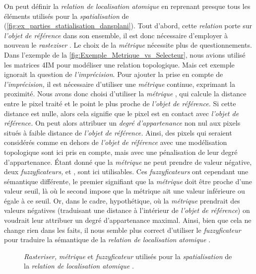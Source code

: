 On peut définir la \emph{relation de localisation atomique}
 en reprenant presque tous les
éléments utilisés pour la \emph{spatialisation} de
(\autoref{fig:ex_parties_statialisation_dansplani}). Tout d'abord,
cette \emph{relation} porte sur \emph{l'objet de référence} dans son
ensemble, il est donc nécessaire d'employer à nouveau le
\emph{rasteziser} . Le choix de la
\emph{métrique} nécessite plus de questionnements.
%
Dans l'exemple de la \autoref{fig:Exemple_Metrique_vs_Selecteur}, nous
avions utilisé les matrices 4IM pour modéliser une relation
topologique. Mais cet exemple ignorait la question de
\emph{l'imprécision}. Pour ajouter la prise en compte de
\emph{l'imprécision,} il est nécessaire d'utiliser une \emph{métrique}
continue, exprimant la proximité. Nous avons donc choisi d'utiliser la
\emph{métrique} , qui calcule la distance entre
le pixel traité et le point le plus proche de \emph{l'objet de
  référence.} Si cette distance est nulle, alors cela signifie que le
pixel est en contact avec \emph{l'objet de référence.} On peut alors
attribuer un \emph{degré d'appartenance} non nul aux pixels situés à
faible distance de \emph{l'objet de référence.} Ainsi, des pixels qui
seraient considérés comme en dehors de \emph{l'objet de référence}
avec une modélisation topologique sont ici pris en compte, mais avec
une pénalisation de leur degré d'appartenance. Étant donné que la
\emph{métrique}  ne peut prendre de valeur
négative, deux \emph{fuzzyficateurs,}  et
, sont ici utilisables. Ces
\emph{fuzzyficateurs} ont cependant une sémantique différente, le
premier signifiant que la \emph{métrique} doit être proche d'une
valeur seuil, là où le second impose que la métrique ait une valeur
inférieure ou égale à ce seuil. Or, dans le cadre, hypothétique, où la
\emph{métrique}  prendrait des valeurs négatives
(\ie traduisant une distance à l'intérieur de \emph{l'objet de
  référence}) on voudrait leur attribuer un degré d'appartenance
maximal. Ainsi, bien que cela ne change rien dans les faits, il nous
semble plus correct d'utiliser le \emph{fuzzyficateur}
 pour traduire la sémantique de la \emph{relation
  de localisation atomique} .

\begin{figure}
  \centering
  
  \caption{\emph{Rasteriser,} \emph{métrique} et \emph{fuzzyficateur}
    utilisés pour la \emph{spatialisation} de la \emph{relation de
      localisation atomique}
    \protect{}.}
  \label{fig:ex_parties_statialisation_dansplani}
\end{figure}

